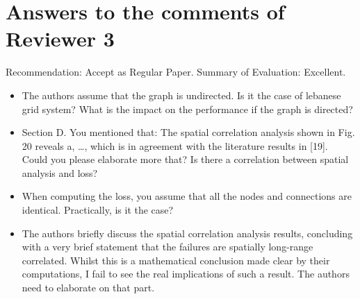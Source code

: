\section{Answers to the comments of Reviewer 3}
%
%

Recommendation: Accept as Regular Paper. Summary of Evaluation: Excellent. 

\begin{itemize}
\item The authors assume that the graph is undirected. Is it the case of lebanese grid system? What is the impact on the performance if the graph is directed? 

\item Section D. You mentioned that:  The spatial correlation analysis shown in Fig. 20 reveals a, …, which is in agreement with the literature results
in [19]. Could you please elaborate more that? Is there a correlation between spatial analysis and loss?   

\item When computing the loss, you assume that all the nodes and connections are identical. Practically, is it the case? 

\item The authors briefly discuss the spatial correlation analysis results, concluding with a very brief statement that the failures are spatially long-range correlated. Whilst this is a mathematical conclusion made clear by their computations, I fail to see the real implications of such a result. The authors need to elaborate on that part.
\end{itemize}


